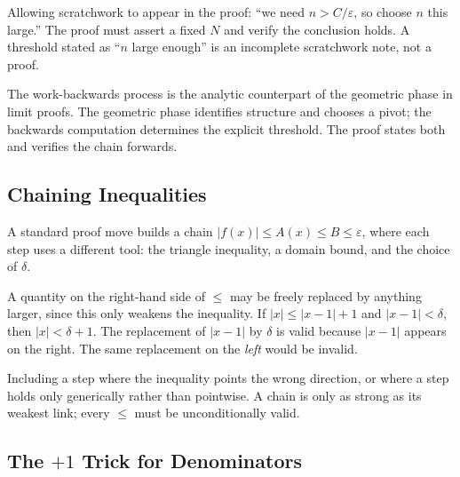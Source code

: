 \begin{remark}
Allowing scratchwork to appear in the proof: ``we need $n>C/\varepsilon$, so
choose $n$ this large.'' The proof must assert a fixed $N$ and verify the
conclusion holds. A threshold stated as ``$n$ large enough'' is an incomplete
scratchwork note, not a proof.
\end{remark}

\begin{remark}
The work-backwards process is the analytic counterpart of the geometric phase
in limit proofs. The geometric phase identifies structure and chooses a pivot;
the backwards computation determines the explicit threshold. The proof states
both and verifies the chain forwards.
\end{remark}

\subsection*{Chaining Inequalities}
\label{subsec:chaining}

A standard proof move builds a chain
$|f(x)|\leq A(x)\leq B\leq\varepsilon$,
where each step uses a different tool: the triangle inequality, a domain
bound, and the choice of $\delta$.

\begin{remark}
A quantity on the right-hand side of $\leq$ may be freely replaced by
anything larger, since this only weakens the inequality. If
$|x|\leq|x-1|+1$ and $|x-1|<\delta$, then $|x|<\delta+1$. The replacement
of $|x-1|$ by $\delta$ is valid because $|x-1|$ appears on the right. The
same replacement on the \emph{left} would be invalid.
\end{remark}

\begin{remark}
Including a step where the inequality points the wrong direction, or where
a step holds only generically rather than pointwise. A chain is only as
strong as its weakest link; every $\leq$ must be unconditionally valid.
\end{remark}

\subsection*{The $+1$ Trick for Denominators}
\label{subsec:plus-one}

